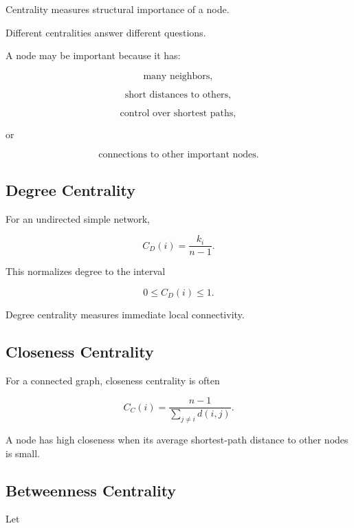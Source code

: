 Centrality measures structural importance of a node.

Different centralities answer different questions.

A node may be important because it has:

\[
\boxed{
\text{many neighbors},
}
\]

\[
\boxed{
\text{short distances to others},
}
\]

\[
\boxed{
\text{control over shortest paths},
}
\]

or

\[
\boxed{
\text{connections to other important nodes}.
}
\]

\subsection{Degree Centrality}
\label{subsec:degree-centrality}

For an undirected simple network,

\[
\boxed{
C_D(i)
=
\frac{k_i}{n-1}.
}
\]

This normalizes degree to the interval

\[
0\leq C_D(i)\leq1.
\]

Degree centrality measures immediate local connectivity.

\subsection{Closeness Centrality}
\label{subsec:closeness-centrality}

For a connected graph, closeness centrality is often

\[
\boxed{
C_C(i)
=
\frac{n-1}
{\sum_{j\neq i}d(i,j)}.
}
\]

A node has high closeness when its average shortest-path distance to other
nodes is small.

\subsection{Betweenness Centrality}
\label{subsec:betweenness-centrality}

Let

